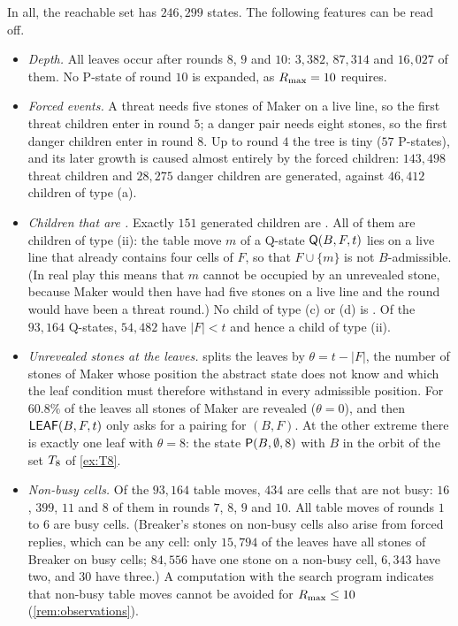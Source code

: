 In all, the reachable set has $246{,}299$ states. The following features can be read off.

\begin{itemize}[leftmargin=1.6em]
\item \emph{Depth.} All leaves occur after rounds $8$, $9$ and $10$: $3{,}382$, $87{,}314$ and $16{,}027$
  of them. No P-state of round $10$ is expanded, as $R_{\max}=10$ requires.
\item \emph{Forced events.} A threat needs five stones of Maker on a live line, so the first threat children
  enter in round $5$; a danger pair needs eight stones, so the first danger children enter in round $8$.
  Up to round $4$ the tree is tiny ($57$ P-states), and its later growth is caused almost entirely by
  the forced children: $143{,}498$ threat children and $28{,}275$ danger children are generated, against
  $46{,}412$ children of type (a).
\item \emph{Children that are \VOID.} Exactly $151$ generated children are \VOID. All of them are children of type
  (ii): the table move $m$ of a Q-state $\mathsf{Q}(B,F,t)$ lies on a live line that already contains four
  cells of $F$, so that $F\cup\{m\}$ is not $B$-admissible. (In real play this means that $m$ cannot be
  occupied by an unrevealed stone, because Maker would then have had five stones on a live line and the
  round would have been a threat round.) No child of type (c) or (d) is \VOID. Of the $93{,}164$ Q-states,
  $54{,}482$ have $|F|<t$ and hence a child of type (ii).
\item \emph{Unrevealed stones at the leaves.}  splits the leaves by
  $\theta=t-|F|$, the number of stones of Maker whose position the abstract state does not know and which
  the leaf condition must therefore withstand in every admissible position. For $60.8\%$ of the leaves
  all stones of Maker are revealed ($\theta=0$), and then $\mathsf{LEAF}(B,F,t)$ only asks for a pairing for $(B,F)$.
  At the other extreme there is exactly one leaf with $\theta=8$: the state $\mathsf{P}(B,\emptyset,8)$ with $B$
  in the orbit of the set $T_8$ of \cref{ex:T8}.
\item \emph{Non-busy cells.} Of the $93{,}164$ table moves, $434$ are cells that are not busy: $16$, $399$,
  $11$ and $8$ of them in rounds $7$, $8$, $9$ and $10$. All table moves of rounds $1$ to $6$ are busy
  cells. (Breaker's stones on non-busy cells also arise from forced replies, which can be any cell: only
  $15{,}794$ of the leaves have all stones of Breaker on busy cells; $84{,}556$ have one stone on a non-busy
  cell, $6{,}343$ have two, and $30$ have three.) A computation with the search program indicates that
  non-busy table moves cannot be avoided for $R_{\max}\le 10$ (\cref{rem:observations}).
\end{itemize}

